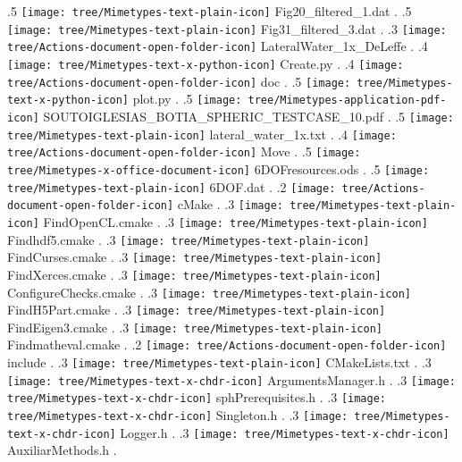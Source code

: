 {.5 { \texttt{[image: tree/Mimetypes-text-plain-icon]} Fig20\_filtered\_1.dat }.
.5 { \texttt{[image: tree/Mimetypes-text-plain-icon]} Fig31\_filtered\_3.dat }.
.3 { \texttt{[image: tree/Actions-document-open-folder-icon]} LateralWater\_1x\_DeLeffe }.
.4 { \texttt{[image: tree/Mimetypes-text-x-python-icon]} Create.py }.
.4 { \texttt{[image: tree/Actions-document-open-folder-icon]} doc }.
.5 { \texttt{[image: tree/Mimetypes-text-x-python-icon]} plot.py }.
.5 { \texttt{[image: tree/Mimetypes-application-pdf-icon]} SOUTOIGLESIAS\_BOTIA\_SPHERIC\_TESTCASE\_10.pdf }.
.5 { \texttt{[image: tree/Mimetypes-text-plain-icon]} lateral\_water\_1x.txt }.
.4 { \texttt{[image: tree/Actions-document-open-folder-icon]} Move }.
.5 { \texttt{[image: tree/Mimetypes-x-office-document-icon]} 6DOFresources.ods }.
.5 { \texttt{[image: tree/Mimetypes-text-plain-icon]} 6DOF.dat }.
.2 { \texttt{[image: tree/Actions-document-open-folder-icon]} cMake }.
.3 { \texttt{[image: tree/Mimetypes-text-plain-icon]} FindOpenCL.cmake }.
.3 { \texttt{[image: tree/Mimetypes-text-plain-icon]} Findhdf5.cmake }.
.3 { \texttt{[image: tree/Mimetypes-text-plain-icon]} FindCurses.cmake }.
.3 { \texttt{[image: tree/Mimetypes-text-plain-icon]} FindXerces.cmake }.
.3 { \texttt{[image: tree/Mimetypes-text-plain-icon]} ConfigureChecks.cmake }.
.3 { \texttt{[image: tree/Mimetypes-text-plain-icon]} FindH5Part.cmake }.
.3 { \texttt{[image: tree/Mimetypes-text-plain-icon]} FindEigen3.cmake }.
.3 { \texttt{[image: tree/Mimetypes-text-plain-icon]} Findmatheval.cmake }.
.2 { \texttt{[image: tree/Actions-document-open-folder-icon]} include }.
.3 { \texttt{[image: tree/Mimetypes-text-plain-icon]} CMakeLists.txt }.
.3 { \texttt{[image: tree/Mimetypes-text-x-chdr-icon]} ArgumentsManager.h }.
.3 { \texttt{[image: tree/Mimetypes-text-x-chdr-icon]} sphPrerequisites.h }.
.3 { \texttt{[image: tree/Mimetypes-text-x-chdr-icon]} Singleton.h }.
.3 { \texttt{[image: tree/Mimetypes-text-x-chdr-icon]} Logger.h }.
.3 { \texttt{[image: tree/Mimetypes-text-x-chdr-icon]} AuxiliarMethods.h }.
}
